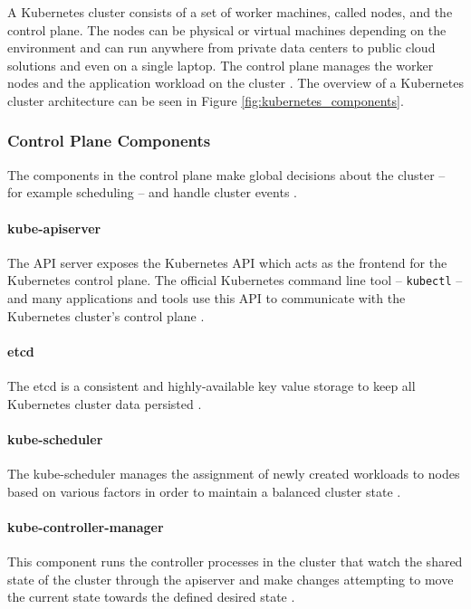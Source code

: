 A Kubernetes cluster consists of a set of worker machines, called nodes, and the control plane. The nodes can be physical or virtual machines depending on the environment and can run anywhere from private data centers to public cloud solutions and even on a single laptop. The control plane manages the worker nodes and the application workload on the cluster \cite{KubernetesArchitecture}. The overview of a Kubernetes cluster architecture can be seen in Figure \ref{fig:kubernetes_components}.

\subsubsection{Control Plane Components}

The components in the control plane make global decisions about the cluster -- for example scheduling -- and handle cluster events \cite{KubernetesArchitecture}. 

\paragraph{kube-apiserver} The API server exposes the Kubernetes API which acts as the frontend for the Kubernetes control plane. The official Kubernetes command line tool -- \texttt{kubectl} -- and many applications and tools use this API to communicate with the Kubernetes cluster's control plane \cite{KubernetesArchitecture}.

\paragraph{etcd} The etcd is a consistent and highly-available key value storage to keep all Kubernetes cluster data persisted \cite{KubernetesArchitecture}.

\paragraph{kube-scheduler} The kube-scheduler manages the assignment of newly created workloads to nodes based on various factors in order to maintain a balanced cluster state \cite{KubernetesArchitecture}.

\paragraph{kube-controller-manager} This component runs the controller processes in the cluster that watch the shared state of the cluster through the apiserver and make changes attempting to move the current state towards the defined desired state \cite{KubernetesArchitecture}.

